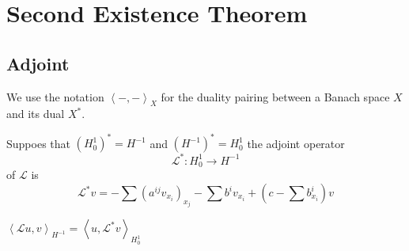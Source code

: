 \section{Second Existence Theorem} %
\subsection{Adjoint}
We use the notation $\left\langle -,- \right\rangle_X$ for the duality pairing between a Banach space $X$ and its dual $X^*$.

\begin{theorem}
    Suppoes that $\left(H_0^1\right)^*=H^{-1}$ and $\left(H^{-1}\right)^*=H_0^1$
    the adjoint operator
    \begin{equation*}
        \mathcal{L}^*: H_0^1 \rightarrow H^{-1}
    \end{equation*}
    of $\mathcal{L}$ is
    \begin{equation*}
        \mathcal{L}^*v
        =
        -\sum \left(a^{ij}v_{x_i}\right)_{x_j} - \sum b^i v_{x_i} +\left(c-\sum b^i_{x_i}\right) v
    \end{equation*}
    \begin{remark}
        $\left\langle \mathcal{L}u, v \right\rangle_{H^{-1}}=\left\langle u, \mathcal{L}^* v \right\rangle_{H_0^1}$
    \end{remark}


\end{theorem}
